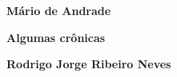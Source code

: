 \textbf{Mário de Andrade} \lipsum[1]

\textbf{Algumas crônicas} \lipsum[2]

\textbf{Rodrigo Jorge Ribeiro Neves} \lipsum[3]







